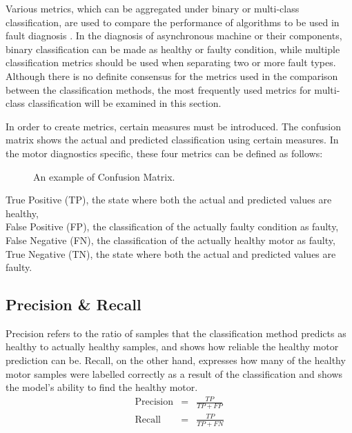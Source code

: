Various metrics, which can be aggregated under binary or multi-class classification, are used to compare the performance of algorithms to be used in fault diagnosis \cite{canbek2017binary,seliya2009study}. In the diagnosis of asynchronous machine or their components, binary classification can be made as healthy or faulty condition, while multiple classification metrics should be used when separating two or more fault types.  Although there is no definite consensus for the metrics used in the comparison between the classification methods, the most frequently used metrics for multi-class classification will be examined in this section.

In order to create metrics, certain measures must be introduced. The confusion matrix shows the actual and predicted classification using certain measures. In the motor diagnostics specific, these four metrics can be defined as follows:
\begin{figure}[h]
	\centering
	\vspace{1cm}
	\caption{An example of Confusion Matrix.}	
	\label{confusion}
\end{figure}

True Positive (TP), the state where both the actual and predicted values are healthy,\\
False Positive (FP), the classification of the actually faulty condition as faulty, \\
False Negative (FN), the classification of the actually healthy motor as faulty,\\
True Negative (TN), the state where both the actual and predicted values are faulty.
\subsection{Precision \& Recall}

Precision refers to the ratio of samples that the classification method predicts as healthy to actually healthy samples, and shows how reliable the healthy motor prediction can be. Recall, on the other hand, expresses how many of the healthy motor samples were labelled correctly as a result of the classification and shows the model's ability to find the healthy motor. 
\begin{eqnarray}
\text{Precision} &=& \displaystyle\frac{TP}{TP+FP}\\
\text{Recall} &=& \displaystyle\frac{TP}{TP+FN} 
\label{precision}
\end{eqnarray}
